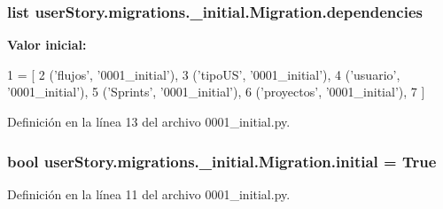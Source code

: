 \subsubsection[{\texorpdfstring{dependencies}{dependencies}}]{\setlength{\rightskip}{0pt plus 5cm}list user\+Story.\+migrations.\+\_\+initial.\+Migration.\+dependencies\hspace{0.3cm}{\ttfamily [static]}}\hypertarget{classuser_story_1_1migrations_1_10001__initial_1_1_migration_af522aa04449a8d4b8d459e8899d8c0e0}{}\label{classuser_story_1_1migrations_1_10001__initial_1_1_migration_af522aa04449a8d4b8d459e8899d8c0e0}
{\bfseries Valor inicial\+:}
\begin{DoxyCode}
1 = [
2         (\textcolor{stringliteral}{'flujos'}, \textcolor{stringliteral}{'0001\_initial'}),
3         (\textcolor{stringliteral}{'tipoUS'}, \textcolor{stringliteral}{'0001\_initial'}),
4         (\textcolor{stringliteral}{'usuario'}, \textcolor{stringliteral}{'0001\_initial'}),
5         (\textcolor{stringliteral}{'Sprints'}, \textcolor{stringliteral}{'0001\_initial'}),
6         (\textcolor{stringliteral}{'proyectos'}, \textcolor{stringliteral}{'0001\_initial'}),
7     ]
\end{DoxyCode}


Definición en la línea 13 del archivo 0001\+\_\+initial.\+py.

\subsubsection[{\texorpdfstring{initial}{initial}}]{\setlength{\rightskip}{0pt plus 5cm}bool user\+Story.\+migrations.\+\_\+initial.\+Migration.\+initial = True\hspace{0.3cm}{\ttfamily [static]}}\hypertarget{classuser_story_1_1migrations_1_10001__initial_1_1_migration_a319827a07cd13a2f9d717db93bcb4afc}{}\label{classuser_story_1_1migrations_1_10001__initial_1_1_migration_a319827a07cd13a2f9d717db93bcb4afc}


Definición en la línea 11 del archivo 0001\+\_\+initial.\+py.

